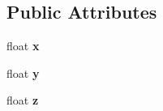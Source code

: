 \subsection*{Public Attributes}
\begin{DoxyCompactItemize}
\item 
\hypertarget{structVectorF_ab7c47ac5d2e6cd5255e06fd70075a380}{float {\bfseries x}}\label{structVectorF_ab7c47ac5d2e6cd5255e06fd70075a380}

\item 
\hypertarget{structVectorF_a097b595dea00472dbbbdb507daef7495}{float {\bfseries y}}\label{structVectorF_a097b595dea00472dbbbdb507daef7495}

\item 
\hypertarget{structVectorF_a6e8e1e9a38b89c34fa378dc34b3ef915}{float {\bfseries z}}\label{structVectorF_a6e8e1e9a38b89c34fa378dc34b3ef915}

\end{DoxyCompactItemize}
